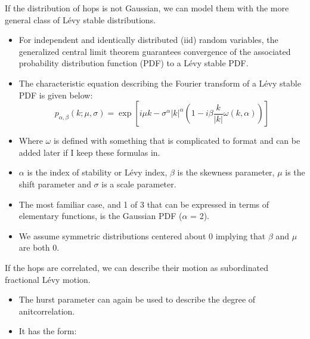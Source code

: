 \documentclass{article}
\begin{document}
  \noindent If the distribution of hops is not Gaussian, we can model them with the
  more general class of L\'evy stable distributions.
  \begin{itemize}
    \item For independent and identically distributed (iid) random variables, the 
    generalized central limit theorem guarantees convergence of the associated 
    probability distribution function (PDF) to a L\'evy stable PDF. \cite{klages_anomalous_2008}
    \item The characteristic equation describing the Fourier transform of a L\'evy 
    stable PDF is given below:
    \begin{equation}
    p_{\alpha, \beta}(k;\mu,\sigma) =\exp\left[i\mu k - \sigma^{\alpha}|k|^{\alpha}\left(1 - i\beta\frac{k}{|k|}\omega(k, \alpha)\right)\right]
    \end{equation}
    \item Where $\omega$ is defined with something that is complicated to format and can be 
    added later if I keep these formulas in. %
    \item $\alpha$ is the index of stability or L\'evy index, $\beta$ is the skewness 
    parameter, $\mu$ is the shift parameter and $\sigma$ is a scale parameter.
    \item The most familiar case, and 1 of 3 that can be expressed in terms of elementary
    functions, is the Gaussian PDF ($\alpha$ = 2).
    \item We assume symmetric distributions centered about 0 implying that $\beta$ and $\mu$ are both 0.
  \end{itemize}
  
  \noindent If the hops are correlated, we can describe their motion as subordinated 
  fractional L\'evy motion.
  \begin{itemize}
    \item The hurst parameter can again be used to describe the degree of anitcorrelation.
    \item It has the form: %
  \end{itemize}
  
\end{document}
